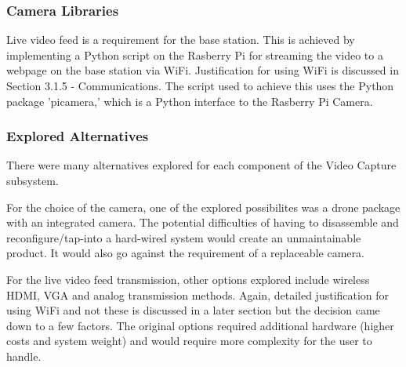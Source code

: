 \subsubsection{Camera Libraries}
Live video feed is a requirement for the base station. This is achieved by implementing a Python script on the Rasberry Pi for streaming the video to a webpage on the base station via WiFi. Justification for using WiFi is discussed in Section 3.1.5 - Communications. The script used to achieve this uses the Python package 'picamera,' which is a Python interface to the Rasberry Pi Camera. 

\subsubsection{Explored Alternatives}
There were many alternatives explored for each component of the Video Capture subsystem.

For the choice of the camera, one of the explored possibilites was a drone package with an integrated camera. The potential difficulties of having to disassemble and reconfigure/tap-into a hard-wired system would create an unmaintainable product. It would also go against the requirement of a replaceable camera.

For the live video feed transmission, other options explored include wireless HDMI, VGA and analog transmission methods. Again, detailed justification for using WiFi and not these is discussed in a later section but the decision came down to a few factors. The original options required additional hardware (higher costs and system weight) and would require more complexity for the user to handle.
